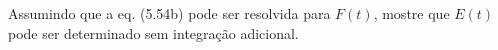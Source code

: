 Assumindo que a eq. (5.54b) pode ser resolvida para $F(t)$, mostre que $E(t)$ pode ser determinado sem integração adicional.
